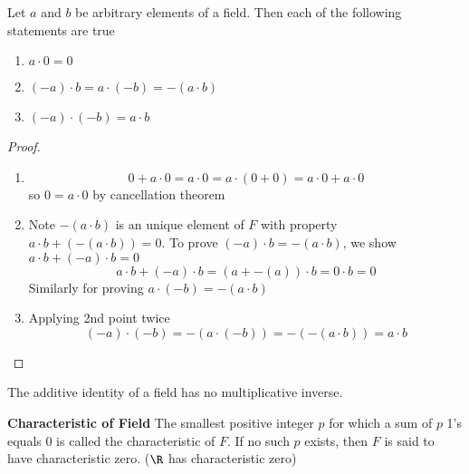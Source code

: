 \documentclass[11pt]{article}
\begin{document}
\begin{theorem*}
    Let $a$ and $b$ be arbitrary elements of a field. Then each of the following statements are true 
    \begin{enumerate}
        \item $a\cdot 0 = 0$
        \item $(-a)\cdot b = a\cdot(-b) = -(a\cdot b)$
        \item $(-a)\cdot (-b) = a\cdot b$
    \end{enumerate}
    \begin{proof}
        $ $\\
        \begin{enumerate}
            \item 
            \[
                0 + a\cdot 0 = a\cdot 0 = a\cdot (0 + 0) = a\cdot 0 + a\cdot 0
            \]
            so $0 = a\cdot 0$ by cancellation theorem
            \item Note $-(a\cdot b)$ is an unique element of $F$ with property $a\cdot b + (-(a\cdot b)) = 0$. To prove $(-a)\cdot b = -(a\cdot b)$, we show $a\cdot b + (-a)\cdot b  =  0$
            \[
                a\cdot b + (-a)\cdot b = (a + -(a))\cdot b = 0\cdot b = 0
            \]
            Similarly for proving $a\cdot(-b) = -(a\cdot b)$
            \item Applying 2nd point twice
            \[
                (-a)\cdot (-b) = -(a\cdot (-b)) = -(-(a\cdot b)) = a\cdot b
            \]
        \end{enumerate}
    \end{proof}
\end{theorem*}



\begin{corollary*}
    The additive identity of a field has no multiplicative inverse. 
\end{corollary*}

\begin{defn*}
    \textbf{Characteristic of Field} The smallest positive integer $p$ for which a sum of $p$ 1's equals 0 is called the characteristic of $F$. If no such $p$ exists, then $F$ is said to have characteristic zero. ($\R$ has characteristic zero)
\end{defn*}


\end{document}
